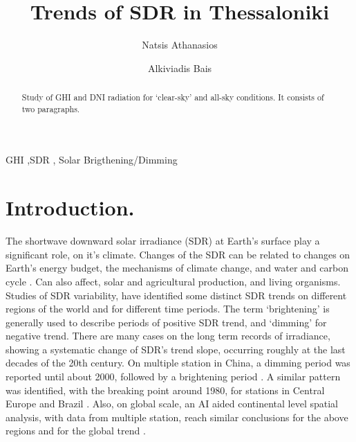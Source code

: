 \documentclass[preprint, 3p,
authoryear]{elsarticle} %
\begin{document}
\begin{frontmatter}

  \title{Trends of SDR in Thessaloniki}
    \author[Laboratory of Atmospheric Physics]{Natsis Athanasios%
  }
    \author[Laboratory of Atmospheric Physics]{Alkiviadis Bais%
  }
  
  \begin{abstract}
  Study of GHI and DNI radiation for `clear-sky' and all-sky conditions.
  It consists of two paragraphs.
  \end{abstract}
    \begin{keyword}
    GHI \sep SDR \sep 
    Solar Brigthening/Dimming
  \end{keyword}
  
 \end{frontmatter}

\hypertarget{introduction.}{%
\section{Introduction.}\label{introduction.}}

The shortwave downward solar irradiance (SDR) at Earth's surface play a
significant role, on it's climate. Changes of the SDR can be related to
changes on Earth's energy budget, the mechanisms of climate change, and
water and carbon cycle \citep{Wild2009}. Can also affect, solar and
agricultural production, and living organisms. Studies of SDR
variability, have identified some distinct SDR trends on different
regions of the world and for different time periods. The term
`brightening' is generally used to describe periods of positive SDR
trend, and `dimming' for negative trend. There are many cases on the
long term records of irradiance, showing a systematic change of SDR's
trend slope, occurring roughly at the last decades of the 20th century.
On multiple station in China, a dimming period was reported until about
2000, followed by a brightening period \citep{Yang2021}. A similar
pattern was identified, with the breaking point around 1980, for
stations in Central Europe \citep{Wild2021} and Brazil
\citep{Yamasoe2021}. Also, on global scale, an AI aided continental
level spatial analysis, with data from multiple station, reach similar
conclusions for the above regions and for the global trend
\citep{Yuan2021}.
\end{document}
